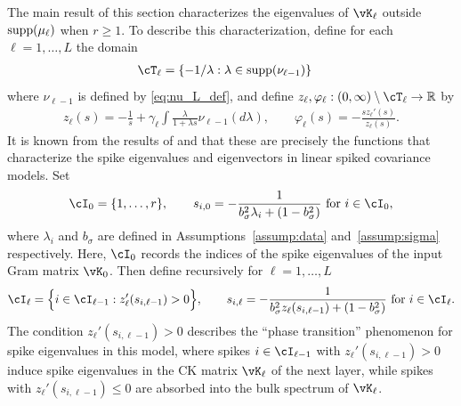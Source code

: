 The main result of this section characterizes the eigenvalues of $\vK_\ell$
outside $\mathrm{supp}({\mu_\ell})$ when $r\geq 1$. To describe this characterization,
define for each $\ell=1,\ldots,L$ the domain
\begin{align*}
\cT_\ell&=\{-1/\lambda:\lambda \in \supp{\nu_{\ell-1}}\}
\end{align*}
where $\nu_{\ell-1}$ is defined by \eqref{eq:nu_L_def},
and define $z_\ell,\varphi_\ell:(0,\infty) \setminus \cT_\ell \to \R$ by
\begin{align}
z_\ell(s)={-}\frac{1}{s}+\gamma_\ell \int\frac{\lambda}{1+\lambda s}
\nu_{\ell-1}(d\lambda), \qquad
\varphi_\ell(s)={-}\frac{sz_\ell'(s)}{z_\ell(s)}.
\label{eq:zell}
\end{align}
It is known from the results of \cite{bai2012sample} and
\cite[Chapter 11]{yao2015sample} that these are precisely the functions
that characterize the spike eigenvalues and eigenvectors in linear spiked
covariance models. Set
\[\cI_0=\{1,\ldots,r\}, \qquad
		s_{i,0}=-\frac{1}{b_\sigma^2\lambda_i+(1-b_\sigma^2)}
\text{ for } i \in \cI_0,\]
where $\lambda_i$ and $b_\sigma$ are defined in Assumptions~\ref{assump:data}
and~\ref{assump:sigma} respectively. Here, $\cI_0$ records the indices of the
spike eigenvalues of the input Gram matrix $\vK_0$.
Then define recursively for $\ell=1,\ldots,L$
\begin{equation}\label{eq:index_set}
\cI_\ell=\Big\{i \in \cI_{\ell-1}:z_\ell'(s_{i,{\ell-1}})>0\Big\},
\qquad
s_{i,\ell}=-\frac{1}{b_\sigma^2z_\ell(s_{i,{\ell-1}})+(1-b_\sigma^2)}
\text{ for } i \in \cI_\ell.
\end{equation}
The condition $z_\ell'(s_{i,\ell-1})>0$ describes the ``phase transition''
phenomenon for spike eigenvalues in this model, where spikes
$i \in \cI_{\ell-1}$ with
$z_\ell'(s_{i,\ell-1})>0$ induce spike eigenvalues in the CK matrix $\vK_\ell$
of the next layer, while spikes with $z_\ell'(s_{i,\ell-1}) \leq 0$ are
absorbed into the bulk spectrum of $\vK_\ell$.

 

